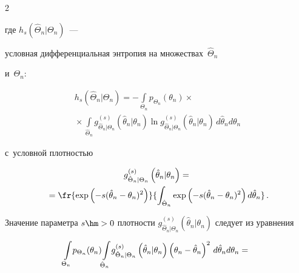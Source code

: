 \begin{multicols}{2}
\begin{equation}
\label{e10-lan}


\end{equation}


где $h_s(\hat{\Theta}_n\vert \Theta_n)$~--- 


условная дифференциальная энт\-ро\-пия на множествах~$\hat{\Theta}_n$ 


и~$\Theta_n$:


\begin{multline*}


h_s\left(\hat{\Theta}_n\vert \Theta_n\right)= -\int\limits_{\Theta_n} p_{\Theta_n}(\theta_n) \times{}\\


{}\times


\int\limits_{\hat{\Theta}_n} g^{(s)}_{\hat{\Theta}_n\vert \Theta_n} (\hat{\theta}_n\vert \theta_n) 


\ln g^{(s)}_{\hat{\Theta}_n\vert \Theta_n} (\hat{\theta}_n\vert \theta_n)\,d\hat{\theta}_n 


d\theta_n


\end{multline*}


 с~условной плот\-ностью 


\begin{multline}


g^{(s)}_{\hat{\Theta}_n\vert \Theta_n} \left(\hat{\theta}_n\vert \theta_n\right) ={}\\


{}=\fr{\exp \left(-s(\hat{\theta}_n-


\theta_n)^2\right)}{\int\nolimits_{\hat{\Theta}_n} \exp \left( -s ( \hat{\theta}_n-\theta_n)^2\right) 


d\hat{\theta}_n}\,.


\label{e11-lan}


\end{multline}


Значение параметра $s\hm> 0$ плот\-ности $g^{(s)}_{\hat{\Theta}_n\vert \Theta_n} 


(\hat{\theta}_n\vert\theta_n)$ следует из уравнения 


\begin{multline*}


\!\int\limits_{\Theta_n} \! p_{\Theta_n} (\theta_n) \!\int\limits_{\hat{\Theta}_n} \!


g^{(s)}_{\hat{\Theta}_n\vert \Theta_n}\left( \hat{\theta}_n\vert \theta_n\right) \left(\theta_n-\hat{\theta}_n\right)^2 \,d\hat{\theta}_n d\theta_n 


={}\hspace*{-0.47pt}\\



\end{multline*}
\end{multicols}
